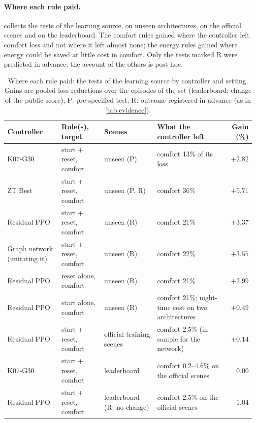 \paragraph{Where each rule paid.}  collects the tests of the learning source, on unseen
architectures, on the official scenes and on the leaderboard. The comfort rules gained where the controller left comfort
loss and not where it left almost none; the energy rules gained where energy could be saved at little cost in comfort.
Only the tests marked R were predicted in advance; the account of the others is post hoc.

\begin{table}[!htbp]
\centering
\caption{Where each rule paid: the tests of the learning source by controller and setting. Gains are pooled loss reductions over the episodes of the
set (leaderboard: change of the public score); P: pre-specified test; R: outcome registered in advance (as in
\cref{tab:evidence}).}
\label{tab:wherepaid}
\footnotesize
\setlength{\tabcolsep}{4pt}
\begin{tabular}{>{\raggedright\arraybackslash}p{1.9cm}>{\raggedright\arraybackslash}p{2.7cm}>{\raggedright\arraybackslash}p{2.6cm}>{\raggedright\arraybackslash}p{3.8cm}r}
\toprule
Controller & Rule(s), target & Scenes & What the controller left & Gain (\%)\\
\midrule
K07-G30 & start + reset, comfort & unseen (P) & comfort 13\% of its loss & $+2.82$\\
ZT Best & start + reset, comfort & unseen (P, R) & comfort 36\% & $+5.71$\\
Residual PPO & start + reset, comfort & unseen (R) & comfort 21\% & $+3.37$\\
Graph network (imitating it) & start + reset, comfort & unseen (R) & comfort 22\% & $+3.55$\\
Residual PPO & reset alone, comfort & unseen (R) & comfort 21\% & $+2.99$\\
Residual PPO & start alone, comfort & unseen (R) & comfort 21\%; night-time cost on two architectures & $+0.49$\\
Residual PPO & start + reset, comfort & official training scenes & comfort 2.5\% (in sample for the network) & $+0.14$\\
K07-G30 & start + reset, comfort & leaderboard & comfort 0.2--4.6\% on the official scenes & $0.00$\\
Residual PPO & start + reset, comfort & leaderboard (R: no change) & comfort 2.5\% on the official scenes & $-1.04$\\

\end{tabular}
\end{table}
